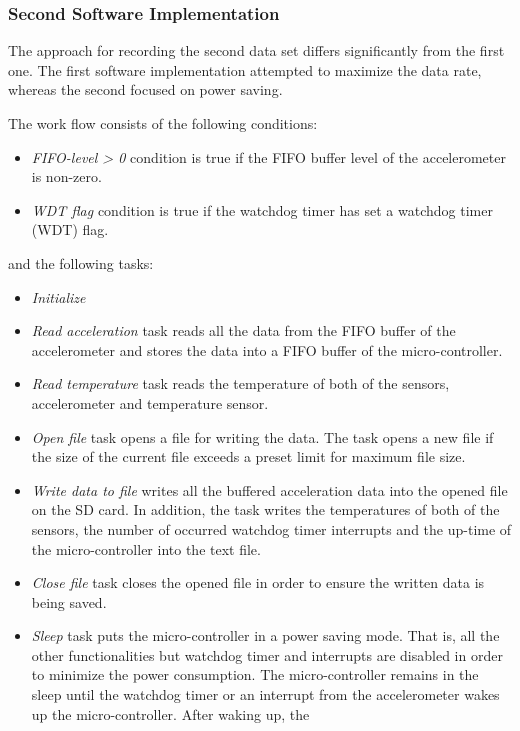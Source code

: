 \documentclass[english,12pt,a4paper,pdftex,elec,utf8]{aaltothesis}
\begin{document}
\subsubsection*{Second Software Implementation}\label{seconddatasetconfigurations}



The approach for recording the second data set differs significantly from the first one. The first software implementation attempted to maximize the data rate, whereas the second focused on power saving. 


The work flow consists of the following conditions:
\begin{itemize}
\item \textit{FIFO-level > 0} condition is true if the FIFO buffer level of the accelerometer is non-zero.

\item \textit{WDT flag} condition is true if the watchdog timer has set a watchdog timer (WDT) flag.
\end{itemize}
and the following tasks:


\begin{itemize}
\item \textit{Initialize}

\item \textit{Read acceleration} task reads all the data from the FIFO buffer of the accelerometer and stores the data into a FIFO buffer of the micro-controller.

\item \textit{Read temperature} task reads the temperature of both of the sensors, accelerometer and temperature sensor.

\item \textit{Open file} task opens a file for writing the data. The task opens a new file if the size of the current file exceeds a preset limit for maximum file size.

\item \textit{Write data to file} writes all the buffered acceleration data into the opened file on the SD card. In addition, the task writes the temperatures of both of the sensors, the number of occurred watchdog timer interrupts and the up-time of the micro-controller into the text file.

\item \textit{Close file} task closes the opened file in order to ensure the written data is being saved. 

\item \textit{Sleep} task puts the micro-controller in a power saving mode. That is, all the other functionalities but watchdog timer and interrupts are disabled in order to minimize the power consumption. The micro-controller remains in the sleep until the watchdog timer or an interrupt from the accelerometer wakes up the micro-controller. After waking up, the 

\end{itemize}
\end{document}

